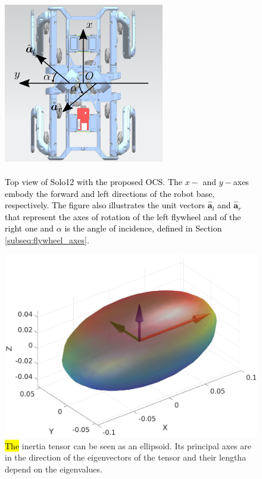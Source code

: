 \documentclass[sensors,article,accept,pdftex,moreauthors]{Definitions/mdpi}
\newcommand{\MF}[1]{\textcolor{black}{#1}}
\begin{document}
\begin{figure}[H]%
 
	\includegraphics[width=7cm,height=8cm,keepaspectratio]{figures/axes.eps}
 
	\caption{\MF{Top view of Solo12 with the proposed OCS. The $x-$ and $y-$axes embody the forward and left directions of the robot base, respectively. The figure also illustrates the unit vectors $\hat{\bm{a}}_l$ and $\hat{\bm{a}}_r$  that represent the axes of rotation of the left flywheel and of the right one and $\alpha$ is the angle of incidence, defined in Section \ref{subseq:flywheel_axes}.}}
	\label{fig:axes}
\end{figure}
\vspace{-11pt}
\begin{figure}[H]%
 \hspace{-16pt}
	\includegraphics[width=1\linewidth]{figures/inertiaEllipsoid.eps}
	\vspace{-9pt}
	\caption{\hl{The} %
 inertia tensor can be seen as an ellipsoid. Its principal axes are in the direction of the eigenvectors of the tensor and their lengtha depend on the eigenvalues.}
	\label{fig:ellipsoid}
\end{figure}
\end{document}
